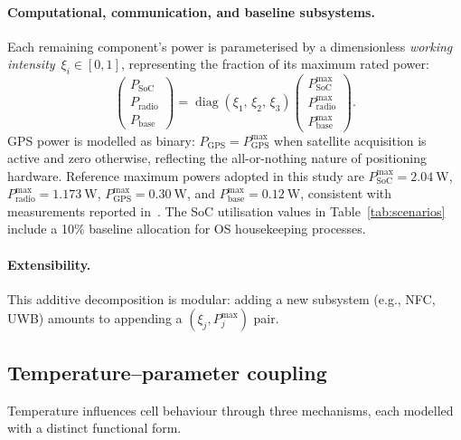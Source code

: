 \documentclass[5p,times,number]{elsarticle}
\newcommand{\tabref}[1]{\textcolor{supercolor}{Table~\ref{#1}}}
\begin{document}
\paragraph{Computational, communication, and baseline subsystems.}
Each remaining component's power is parameterised by a dimensionless \emph{working intensity}~$\xi_i \in [0,1]$, representing the fraction of its maximum rated power:
\begin{equation}\label{eq:xi}
\begin{pmatrix} P_{\mathrm{SoC}} \\ P_{\mathrm{radio}} \\ P_{\mathrm{base}} \end{pmatrix}
= \operatorname{diag}(\xi_1,\,\xi_2,\,\xi_3)
\begin{pmatrix} P_{\mathrm{SoC}}^{\max} \\ P_{\mathrm{radio}}^{\max} \\ P_{\mathrm{base}}^{\max} \end{pmatrix}.
\end{equation}
GPS power is modelled as binary: $P_{\mathrm{GPS}} = P_{\mathrm{GPS}}^{\max}$ when satellite acquisition is active and zero otherwise, reflecting the all-or-nothing nature of positioning hardware.
Reference maximum powers adopted in this study are $P_{\mathrm{SoC}}^{\max} = \SI{2.04}{\watt}$, $P_{\mathrm{radio}}^{\max} = \SI{1.173}{\watt}$, $P_{\mathrm{GPS}}^{\max} = \SI{0.30}{\watt}$, and $P_{\mathrm{base}}^{\max} = \SI{0.12}{\watt}$, consistent with measurements reported in~\cite{Carroll2010,Chen2014}.
The SoC utilisation values in \tabref{tab:scenarios} include a 10\% baseline allocation for OS housekeeping processes.

\paragraph{Extensibility.}
This additive decomposition is modular: adding a new subsystem (e.g., NFC, UWB) amounts to appending a $(\xi_j, P_j^{\max})$ pair.

\subsection{Temperature--parameter coupling}\label{sec:temperature}
Temperature influences cell behaviour through three mechanisms, each modelled with a distinct functional form.
\end{document}
